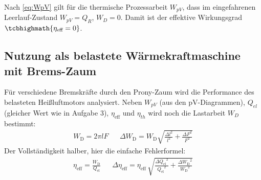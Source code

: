 Nach \cref{eq:WpV} gilt für die thermische Prozessarbeit \(W_{pV}\), dass im eingefahrenen Leerlauf-Zustand \(W_{pV}=Q_R\), \(W_D=0\). Damit ist der effektive Wirkungsgrad \(\tcbhighmath{\eta_\text{eff}=0}\). 
\FloatBarrier

\subsection{Nutzung als belastete Wärmekraftmaschine mit Brems-Zaum}
\label{sec:A4}
Für verschiedene Bremskräfte durch den Prony-Zaum wird die Performance des belasteten Heißluftmotors analysiert. Neben \(W_{pV}\) (aus den pV-Diagrammen), \(Q_{el}\) (gleicher Wert wie in Aufgabe 3), \(\eta_\text{eff}\) und \(\eta_{th}\) wird noch die Lastarbeit \(W_D\) bestimmt:
\begin{align}
\label{eq:sdfsdfzsdf}
    W_\text{D} = 2 \pi lF && \Delta W_\text{D} = W_\text{D}\sqrt{\frac{\Delta l^{2}}{l^{2}} + \frac{\Delta F^{2}}{F^{2}}}
\end{align} 
Der Vollständigkeit halber, hier die einfache Fehlerformel: 
\begin{align}
\label{eq:err_func_eta_efffffff}
    \eta_\text{eff} = \frac{W_\text{D}}{Q_\text{el}} && \Delta \eta_\text{eff} = \eta_\text{eff} \, \sqrt{\frac{\Delta {Q_\text{el}}^{2}}{{Q_\text{el}}^{2}} + \frac{\Delta {W_\text{D}}^{2}}{{W_\text{D}}^{2}}}  
\end{align}

